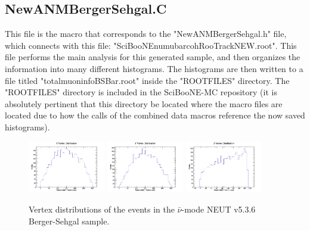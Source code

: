 \documentclass[11pt]{article}
\begin{document}
\subsection{NewANMBergerSehgal.C}
\label{sub:NewANMBergerSehgal.C}
This file is the macro that corresponds to the "NewANMBergerSehgal.h" file, which connects with this file: "SciBooNE\textunderscore numubar\textunderscore coh\textunderscore RooTrack\textunderscore NEW.root". This file performs the main analysis for this generated sample, and then organizes the information into many different histograms. The histograms are then written to a file titled "totalmuoninfoBSBar.root" inside the "ROOTFILES" directory. The "ROOTFILES" directory is included in the SciBooNE-MC repository (it is absolutely pertinent that this directory be located where the macro files are located due to how the calls of the combined data macros reference the now saved histograms).


\begin{figure}[H]
\centering
\includegraphics[width=0.3\textwidth]{NewANMBergerSehgalImages/4-XVertexDistributionANMBS.png}
\includegraphics[width=0.3\textwidth]{NewANMBergerSehgalImages/3-YVertexDistributionANMBS.png}
\includegraphics[width=0.3\textwidth]{NewANMBergerSehgalImages/2-ZVertexDistributionANMBS.png}
\caption{Vertex distributions of the events in the $\bar{\nu}$-mode NEUT v5.3.6 Berger-Sehgal sample.}
\label{fig:app:ANMVertexDistributionBS}
\end{figure}
\end{document}
